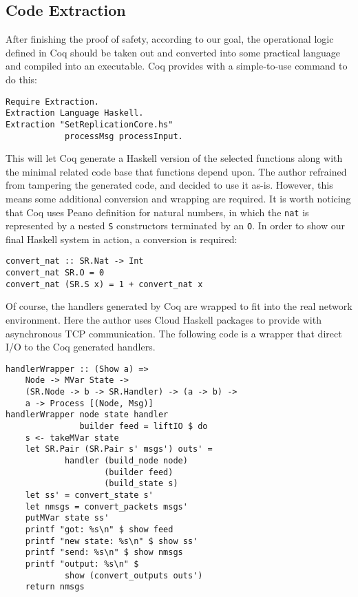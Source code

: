 \documentclass[twocolumn]{article}
\begin{document}
\subsection{Code Extraction}
After finishing the proof of safety, according to our goal, the operational
logic defined in Coq should be taken out and converted into some practical language and
compiled into an executable. Coq provides with a simple-to-use command to do this:
\begin{center}
\small
\begin{verbatim}
Require Extraction.
Extraction Language Haskell.
Extraction "SetReplicationCore.hs"
            processMsg processInput.
\end{verbatim}
\end{center}
This will let Coq generate a Haskell version of the selected functions along
with the minimal related code base that functions depend upon.  The author
refrained from tampering the generated code, and decided to use it as-is.
However, this means some additional conversion and wrapping are required. It is
worth noticing that Coq uses Peano definition for natural numbers, in which the
\texttt{nat} is represented by a nested \texttt{S} constructors terminated by
an \texttt{O}. In order to show our final Haskell system in action, a
conversion is required:
\begin{center}
\small
\begin{verbatim}
convert_nat :: SR.Nat -> Int
convert_nat SR.O = 0
convert_nat (SR.S x) = 1 + convert_nat x
\end{verbatim}
\end{center}
Of course, the handlers generated by Coq are wrapped to fit into the real
network environment. Here the author uses Cloud Haskell packages to provide
with asynchronous TCP communication. The following code is a wrapper that
direct I/O to the Coq generated handlers.
\begin{center}
\small
\begin{verbatim}
handlerWrapper :: (Show a) =>
    Node -> MVar State ->
    (SR.Node -> b -> SR.Handler) -> (a -> b) ->
    a -> Process [(Node, Msg)]
handlerWrapper node state handler
               builder feed = liftIO $ do
    s <- takeMVar state
    let SR.Pair (SR.Pair s' msgs') outs' =
            handler (build_node node)
                    (builder feed)
                    (build_state s)
    let ss' = convert_state s'
    let nmsgs = convert_packets msgs'
    putMVar state ss'
    printf "got: %s\n" $ show feed
    printf "new state: %s\n" $ show ss'
    printf "send: %s\n" $ show nmsgs
    printf "output: %s\n" $
            show (convert_outputs outs')
    return nmsgs
\end{verbatim}
\end{center}
\end{document}
